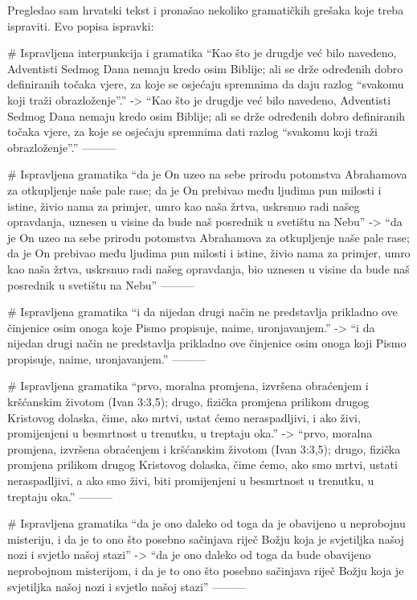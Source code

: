 Pregledao sam hrvatski tekst i pronašao nekoliko gramatičkih grešaka koje treba ispraviti. Evo popisa ispravki:

# Ispravljena interpunkcija i gramatika
“Kao što je drugdje već bilo navedeno, Adventisti Sedmog Dana nemaju kredo osim Biblije; ali se drže određenih dobro definiranih točaka vjere, za koje se osjećaju spremnima da daju razlog “svakomu koji traži obrazloženje”.”
->
“Kao što je drugdje već bilo navedeno, Adventisti Sedmog Dana nemaju kredo osim Biblije; ali se drže određenih dobro definiranih točaka vjere, za koje se osjećaju spremnima dati razlog “svakomu koji traži obrazloženje”.”
---------

# Ispravljena gramatika
“da je On uzeo na sebe prirodu potomstva Abrahamova za otkupljenje naše pale rase; da je On prebivao među ljudima pun milosti i istine, živio nama za primjer, umro kao naša žrtva, uskrsnuo radi našeg opravdanja, uznesen u visine da bude naš posrednik u svetištu na Nebu”
->
“da je On uzeo na sebe prirodu potomstva Abrahamova za otkupljenje naše pale rase; da je On prebivao među ljudima pun milosti i istine, živio nama za primjer, umro kao naša žrtva, uskrsnuo radi našeg opravdanja, bio uznesen u visine da bude naš posrednik u svetištu na Nebu”
---------

# Ispravljena gramatika
“i da nijedan drugi način ne predstavlja prikladno ove činjenice osim onoga koje Pismo propisuje, naime, uronjavanjem.”
->
“i da nijedan drugi način ne predstavlja prikladno ove činjenice osim onoga koji Pismo propisuje, naime, uronjavanjem.”
---------

# Ispravljena gramatika
“prvo, moralna promjena, izvršena obraćenjem i kršćanskim životom (Ivan 3:3,5); drugo, fizička promjena prilikom drugog Kristovog dolaska, čime, ako mrtvi, ustat ćemo neraspadljivi, i ako živi, promijenjeni u besmrtnost u trenutku, u treptaju oka.”
->
“prvo, moralna promjena, izvršena obraćenjem i kršćanskim životom (Ivan 3:3,5); drugo, fizička promjena prilikom drugog Kristovog dolaska, čime ćemo, ako smo mrtvi, ustati neraspadljivi, a ako smo živi, biti promijenjeni u besmrtnost u trenutku, u treptaju oka.”
---------

# Ispravljena gramatika
“da je ono daleko od toga da je obavijeno u neprobojnu misteriju, i da je to ono što posebno sačinjava riječ Božju koja je svjetiljka našoj nozi i svjetlo našoj stazi”
->
“da je ono daleko od toga da bude obavijeno neprobojnom misterijom, i da je to ono što posebno sačinjava riječ Božju koja je svjetiljka našoj nozi i svjetlo našoj stazi”
---------

